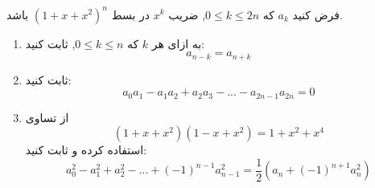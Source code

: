     \p
    فرض کنید 
	$a_k$
	كه
	$0 \leq k \leq 2n$,
	 ضریب 
	 $x^k$ در بسط $(1 + x + x^2)^n$ باشد.
	\begin{enumerate}
        \item
    	به ازای هر $k$
		كه
		$0 \leq k \leq n$,
		ثابت کنید:
		 $$a_{n-k} = a_{n+k}$$
    	\item
    	ثابت کنید:
        $$a_0a_1 - a_1a_2 + a_2a_3 - ... - a_{2n-1}a_{2n} = 0$$
    	\item
    	از تساوی
    	$$(1 + x + x^2)(1 - x + x^2) = 1 + x^2 + x^4$$
    	استفاده کرده و ثابت کنید:
    	$$a_0^2 - a_1^2 + a_2^2 - ... + (-1)^{n - 1}a_{n - 1}^2 = \frac{1}{2}(a_n + (-1)^{n + 1}a_n^2)$$
    	
	\end{enumerate}
